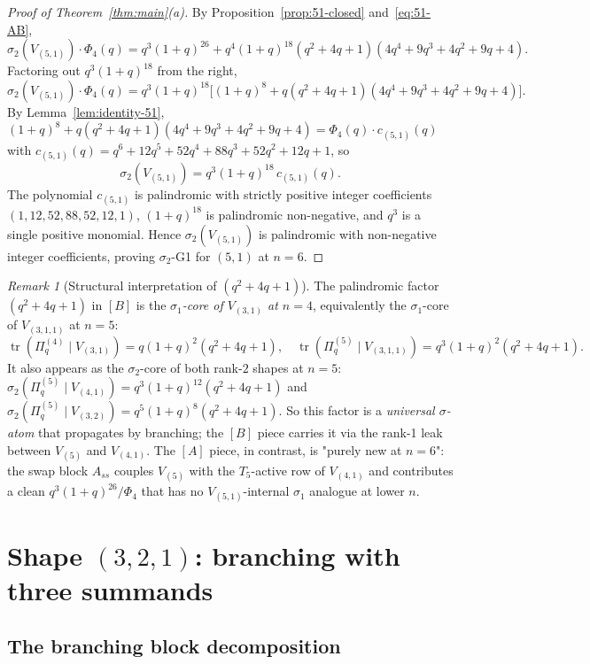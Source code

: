 \documentclass[11pt]{article}
\theoremstyle{plain}
\theoremstyle{definition}
\theoremstyle{remark}
\newtheorem{remark}[theorem]{Remark}
\newcommand{\Pibs}{\Pi_q}
\newcommand{\trace}{\operatorname{tr}}
\begin{document}
\begin{proof}[Proof of Theorem~\ref{thm:main}(a)]
By Proposition~\ref{prop:51-closed} and~\eqref{eq:51-AB},
\[
  \sigma_2(V_{(5,1)}) \cdot \Phi_4(q)
    = q^3(1+q)^{26} + q^4(1+q)^{18}(q^2+4q+1)(4q^4+9q^3+4q^2+9q+4).
\]
Factoring out $q^3(1+q)^{18}$ from the right,
\[
  \sigma_2(V_{(5,1)}) \cdot \Phi_4(q)
    = q^3(1+q)^{18} \bigl[(1+q)^8 + q(q^2+4q+1)(4q^4+9q^3+4q^2+9q+4)\bigr].
\]
By Lemma~\ref{lem:identity-51},
$(1+q)^8 + q(q^2+4q+1)(4q^4+9q^3+4q^2+9q+4) = \Phi_4(q)\cdot c_{(5,1)}(q)$
with $c_{(5,1)}(q) = q^6 + 12q^5 + 52q^4 + 88q^3 + 52q^2 + 12q + 1$, so
\[
  \sigma_2(V_{(5,1)}) = q^3 (1+q)^{18}\,c_{(5,1)}(q).
\]
The polynomial $c_{(5,1)}$ is palindromic with strictly positive integer
coefficients $(1,12,52,88,52,12,1)$, $(1+q)^{18}$ is palindromic
non-negative, and $q^3$ is a single positive monomial. Hence $\sigma_2(V_{(5,1)})$
is palindromic with non-negative integer coefficients, proving
$\sigma_2$-G1 for $(5,1)$ at $n=6$.
\end{proof}

\begin{remark}[Structural interpretation of $(q^2+4q+1)$]\label{rmk:51-inheritance}
The palindromic factor $(q^2+4q+1)$ in $[B]$ is the \emph{$\sigma_1$-core
of $V_{(3,1)}$ at $n=4$}, equivalently the $\sigma_1$-core of $V_{(3,1,1)}$
at $n=5$:
\[
  \trace(\Pibs^{(4)}\mid V_{(3,1)}) = q(1+q)^2(q^2+4q+1), \quad
  \trace(\Pibs^{(5)}\mid V_{(3,1,1)}) = q^3(1+q)^2(q^2+4q+1).
\]
It also appears as the $\sigma_2$-core of both rank-$2$ shapes at $n=5$:
$\sigma_2(\Pibs^{(5)}\mid V_{(4,1)}) = q^3(1+q)^{12}(q^2+4q+1)$ and
$\sigma_2(\Pibs^{(5)}\mid V_{(3,2)}) = q^5(1+q)^8(q^2+4q+1)$. So this
factor is a \emph{universal $\sigma$-atom} that propagates by branching;
the $[B]$ piece carries it via the rank-1 leak between $V_{(5)}$ and $V_{(4,1)}$.
The $[A]$ piece, in contrast, is "purely new at $n=6$": the swap block
$A_{ss}$ couples $V_{(5)}$ with the $T_5$-active row of $V_{(4,1)}$ and
contributes a clean $q^3(1+q)^{26}/\Phi_4$ that has no $V_{(5,1)}$-internal
$\sigma_1$ analogue at lower $n$.
\end{remark}

\section{Shape $(3,2,1)$: branching with three summands}\label{sec:321}

\subsection{The branching block decomposition}
\end{document}

